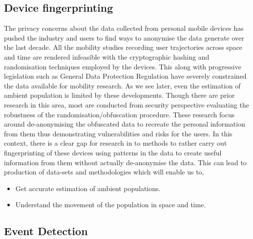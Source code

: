 \subsection{Device fingerprinting}


The privacy concerns about the data collected from personal mobile devices has pushed the industry and users to find ways to anonymise the data generate over the last decade.
All the mobility studies recording user trajectories across space and time are rendered infeasible with the cryptographic hashing and randomisation techniques employed by the devices. 
This along with progressive legislation such as General Data Protection Regulation have severely constrained the data available for mobility research.
As we see later, even the estimation of ambient population is limited by these developments.
Though there are prior research in this area, most are conducted from security perspective evaluating the robustness of the randomisation/obfuscation procedure.
These research focus around de-anonymising the obfuscated data to recreate the personal information from them thus demonstrating vulnerabilities and risks for the users. 
In this context, there is a clear gap for research in to methods to rather carry out  fingerprinting of these devices using patterns in the data to create useful information from them without actually de-anonymise the data.
This can lead to production of data-sets and methodologies which will enable us to,

\begin{itemize}
  \setlength{\itemindent}{2em}
  \itemsep-0.25em
  \item Get accurate estimation of ambient populations.
  \item Understand the movement of the population in space and time.
\end{itemize}

\subsection{Event Detection}

